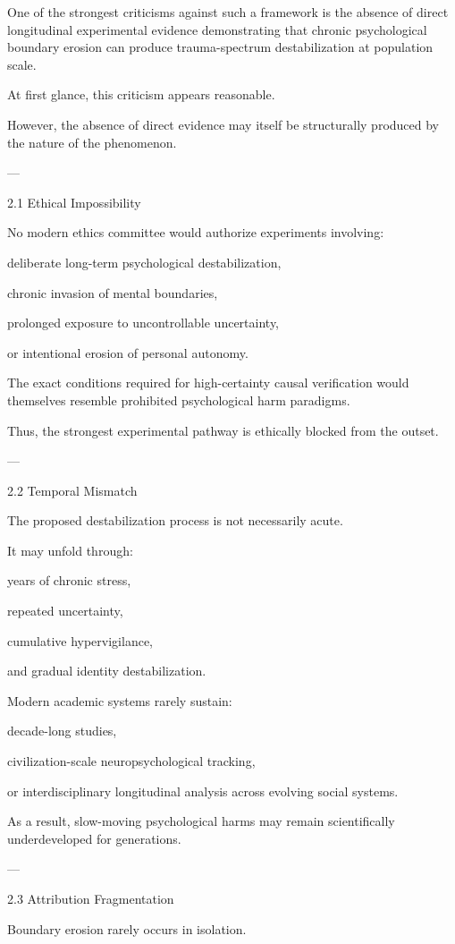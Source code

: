 One of the strongest criticisms against such a framework is the absence of direct longitudinal experimental evidence demonstrating that chronic psychological boundary erosion can produce trauma-spectrum destabilization at population scale.

At first glance, this criticism appears reasonable.

However, the absence of direct evidence may itself be structurally produced by the nature of the phenomenon.


---

2.1 Ethical Impossibility

No modern ethics committee would authorize experiments involving:

deliberate long-term psychological destabilization,

chronic invasion of mental boundaries,

prolonged exposure to uncontrollable uncertainty,

or intentional erosion of personal autonomy.


The exact conditions required for high-certainty causal verification would themselves resemble prohibited psychological harm paradigms.

Thus, the strongest experimental pathway is ethically blocked from the outset.


---

2.2 Temporal Mismatch

The proposed destabilization process is not necessarily acute.

It may unfold through:

years of chronic stress,

repeated uncertainty,

cumulative hypervigilance,

and gradual identity destabilization.


Modern academic systems rarely sustain:

decade-long studies,

civilization-scale neuropsychological tracking,

or interdisciplinary longitudinal analysis across evolving social systems.


As a result, slow-moving psychological harms may remain scientifically underdeveloped for generations.


---

2.3 Attribution Fragmentation

Boundary erosion rarely occurs in isolation.

